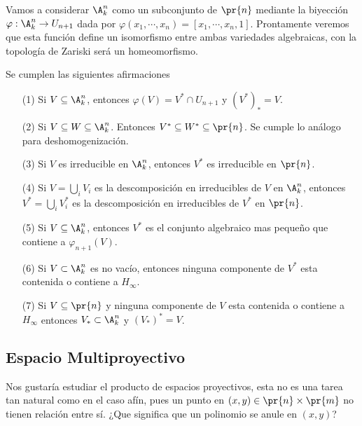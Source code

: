 \documentclass{article}
\begin{document}
\vspace{2mm}
\noindent Vamos a considerar $\A^{n}_{k}$ como un subconjunto de $\pr{n}$ mediante la biyección 
$\varphi:\A^{n}_{k}\to U_{n+1}$ dada por $\varphi(x_{1},\cdots,x_{n})=[x_{1},\cdots,x_{n},1]$. 
Prontamente veremos que esta función define un isomorfismo entre ambas variedades algebraicas,
con la topología de Zariski será un homeomorfismo.
\begin{prop}
    Se cumplen las siguientes afirmaciones
    \begin{itemize}
        \item[(1)] Si $V\subseteq\A^{n}_{k}$, entonces $\varphi(V)=V^{*}\cap U_{n+1}$ y 
        $(V^{*})_{*}=V$.

        \item[(2)] Si $V\subseteq W\subseteq\A^{n}_{k}$. Entonces $V^{*}\subseteq W^{*}
        \subseteq\pr{n}$. Se cumple lo análogo para deshomogenización.

        \item[(3)] Si $V$ es irreducible en $\A^{n}_{k}$, entonces $V^{*}$ es irreducible en 
        $\pr{n}$.

        \item[(4)] Si $V=\bigcup_{i}V_{i}$ es la descomposición en irreducibles de $V$ en 
        $\A^{n}_{k}$, entonces $V^{*}=\bigcup_{i}V^{*}_{i}$ es la descomposición en irreducibles 
        de $V^{*}$ en $\pr{n}$.

        \item[(5)] Si $V\subseteq\A^{n}_{k}$, entonces $V^{*}$ es el conjunto algebraico mas 
        pequeño que contiene a $\varphi_{n+1}(V)$.

        \item[(6)] Si $V\subset\A^{n}_{k}$ es no vacío, entonces ninguna componente de $V^{*}$
        esta contenida o contiene a $H_{\infty}$.

        \item[(7)] Si $V\subseteq\pr{n}$ y ninguna componente de $V$ esta contenida o contiene a 
        $H_{\infty}$ entonces $V_{*}\subset\A^{n}_{k}$ y $(V_{*})^{*}=V$.
    \end{itemize}
\end{prop}

\subsection{Espacio Multiproyectivo}
\noindent Nos gustaría estudiar el producto de espacios proyectivos, esta no es una tarea tan 
natural como en el caso afín, pues un punto en $(x,y)\in\pr{n}\times\pr{m}$ no tienen relación 
entre sí. ¿Que significa que un polinomio se anule en $(x,y)$?
\end{document}
